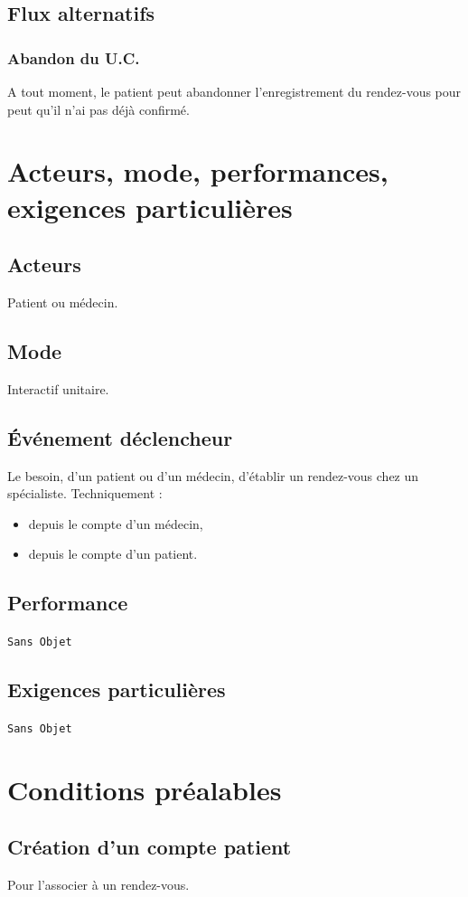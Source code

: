 \subsection{Flux alternatifs}

\subsubsection{Abandon du U.C.}
A tout moment, le patient peut abandonner l'enregistrement du rendez-vous pour
peut qu'il n'ai pas déjà confirmé.
\newpage

\section{Acteurs, mode, performances, exigences particulières}
\subsection{Acteurs}
Patient ou médecin.
\subsection{Mode}
Interactif unitaire.
\subsection{Événement déclencheur}
Le besoin, d'un patient ou d'un médecin, d'établir un rendez-vous chez un
spécialiste.
Techniquement :
\begin{itemize}
	\item depuis le compte d'un médecin,
	\item depuis le compte d'un patient.
\end{itemize}

\subsection{Performance}
\texttt{Sans Objet}
\subsection{Exigences particulières}
\texttt{Sans Objet}
\newpage

\section{Conditions préalables}
\subsection{Création d'un compte patient}
Pour l'associer à un rendez-vous.
